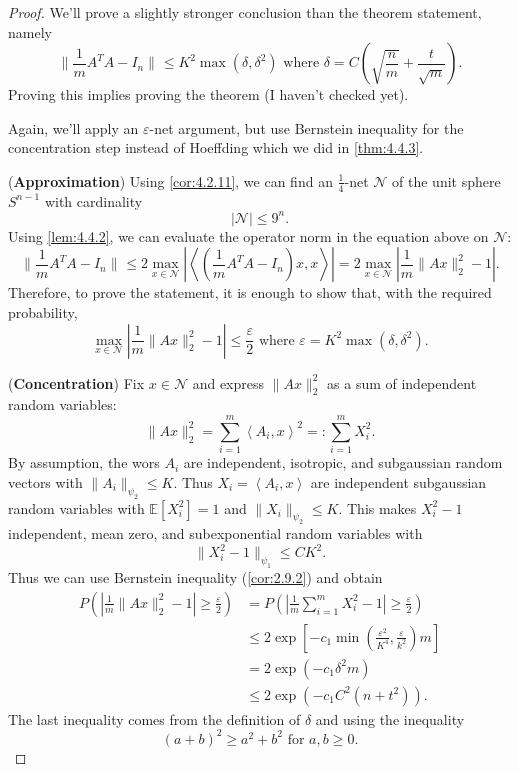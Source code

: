 \begin{proof}
We'll prove a slightly stronger conclusion than the theorem statement, namely 
\[ \lVert \frac{1}{m}A^TA - I_n \rVert_{} \leq K^2 \max_{}(\delta, \delta^2) \text{ where } 
\delta = C \left( \sqrt{\frac{n}{m}} + \frac{t}{\sqrt{m}} \right). \]
Proving this implies proving the theorem (I haven't checked yet).

Again, we'll apply an $\varepsilon$-net argument, but use Bernstein inequality for the concentration step 
instead of Hoeffding which we did in \cref{thm:4.4.3}.

(\textbf{Approximation}) Using \cref{cor:4.2.11}, we can find an $\frac{1}{4}$-net $\mathcal{N}$ of the unit 
sphere $S^{n - 1}$ with cardinality 
\[ |\mathcal{N}| \leq 9^n. \]
Using \cref{lem:4.4.2}, we can evaluate the operator norm in the equation above on $\mathcal{N}$:
\[ \lVert \frac{1}{m}A^T A - I_n \rVert_{} \leq 2 \max_{x \in \mathcal{N}} 
\left| \left\langle (\frac{1}{m}A^T A - I_n)x, x \right\rangle \right| 
= 2 \max_{x \in \mathcal{N}} \left| \frac{1}{m} \lVert Ax \rVert_{2}^2 - 1 \right|. \]
Therefore, to prove the statement, it is enough to show that, with the required probability, 
\[ \max_{x \in \mathcal{N}} \left| \frac{1}{m} \lVert Ax \rVert_{2}^2 - 1 \right| \leq \frac{\varepsilon}{2} 
\text{ where } \varepsilon = K^2 \max_{}(\delta, \delta^2). \]

(\textbf{Concentration}) Fix $x \in \mathcal{N}$ and express $\lVert Ax \rVert_{2}^2$ as a sum of 
independent random variables: 
\[ \lVert Ax \rVert_{2}^2 = \sum_{i = 1}^{m} \left\langle A_i, x \right\rangle^2 =: \sum_{i = 1}^{m} X_i^2. \]
By assumption, the wors $A_i$ are independent, isotropic, and subgaussian random vectors with 
$\lVert A_i \rVert_{\psi_2} \leq K$. Thus $X_i = \left\langle A_i, x \right\rangle$ are independent subgaussian 
random variables with $\mathbb{E}[X_i^2] = 1$ and $\lVert X_i \rVert_{\psi_2} \leq K$. This makes 
$X_i^2 - 1$ independent, mean zero, and subexponential random variables with 
\[ \lVert X_i^2 - 1 \rVert_{\psi_1} \leq CK^2. \]
Thus we can use Bernstein inequality (\cref{cor:2.9.2}) and obtain 
\begin{align*}
	P \left( \left| \frac{1}{m}\lVert Ax \rVert_{2}^2 - 1 \right| \geq \frac{\varepsilon}{2} \right) 
	&= P \left( \left| \frac{1}{m} \sum_{i = 1}^{m} X_i^2 - 1 \right| \geq \frac{\varepsilon}{2} \right) \\
	&\leq 2 \exp{\left[ -c_1 \min_{}\left( \frac{\varepsilon^2}{K^4}, \frac{\varepsilon}{k^2} 
	\right)m \right]} \\
	&= 2 \exp{(-c_1 \delta^2 m)} \\
	&\leq 2 \exp{(-c_1 C^2(n + t^2))}.
\end{align*}
The last inequality comes from the definition of $\delta$ and using the inequality 
\[ (a + b)^2 \geq a^2 + b^2 \text{ for } a, b \geq 0. \]


\end{proof}

